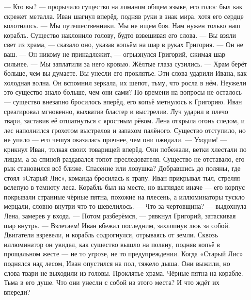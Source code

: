 \documentclass[12pt,a4paper]{book}
\begin{document}
— Кто вы? — прорычало существо на ломаном общем языке, его голос был как скрежет металла.
Иван шагнул вперёд, подняв руки в знак мира, хотя его сердце колотилось. — Мы путешественники. Мы не ищем боя. Нам нужен только наш корабль.
Существо наклонило голову, будто взвешивая его слова. — Вы взяли свет из храма, — сказало оно, указав копьём на шар в руках Григория. — Он не ваш.
— Он никому не принадлежит, — огрызнулся Григорий, сжимая шар сильнее. — Мы заплатили за него кровью.
Жёлтые глаза сузились. — Храм берёт больше, чем вы думаете. Вы унесли его проклятье.
Эти слова ударили Ивана, как холодная волна. Он вспомнил зеркала, их шепот, тьму, что росла в нём. Неужели это существо знало больше, чем они сами? Но времени на вопросы не осталось — существо внезапно бросилось вперёд, его копьё метнулось к Григорию.
Иван среагировал мгновенно, выхватив бластер и выстрелив. Луч ударил в плечо твари, заставив её отшатнуться с яростным рёвом. Лена открыла огонь следом, и лес наполнился грохотом выстрелов и запахом палёного. Существо отступило, но не упало — его чешуя оказалась прочнее, чем они ожидали.
— Уходим! — крикнул Иван, толкая своих товарищей вперёд. Они побежали, ветки хлестали по лицам, а за спиной раздавался топот преследователя. Существо не отставало, его рык становился всё ближе.
Спасение или ловушка?
Добравшись до поляны, где стоял «Старый Лис», команда бросилась к трапу. Иван прикрывал тыл, стреляя вслепую в темноту леса. Корабль был на месте, но выглядел иначе — его корпус покрывали странные чёрные пятна, похожие на плесень, а иллюминаторы тускло мерцали, словно внутри что-то шевелилось.
— Что за чертовщина? — выдохнула Лена, замерев у входа.
— Потом разберёмся, — рявкнул Григорий, затаскивая шар внутрь. — Взлетаем!
Иван вбежал последним, захлопнув люк за собой. Двигатели взревели, и корабль содрогнулся, отрываясь от земли. Сквозь иллюминатор он увидел, как существо вышло на поляну, подняв копьё в прощальном жесте — не то угрозе, не то предупреждении.
Когда «Старый Лис» поднялся над лесом, Иван опустился на пол, тяжело дыша. Они выжили, но слова твари не выходили из головы. Проклятье храма. Чёрные пятна на корабле. Тьма в его душе. Что они унесли с собой из этого места? И что ждёт их впереди?
\end{document}
